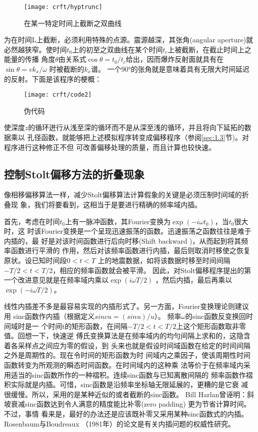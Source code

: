 \begin{figure}[H]
\centering
\texttt{[image: crft/hyptrunc]}
\caption[hyptrunc]{在某一特定时间上截断之双曲线}
\label{fig:crft/hyptrunc}
\end{figure}

为在时间L上截断，必须利用特殊的点源。震源越深，其张角(angular
aperture)就
必然越狭窄。使时间$t_0$上的初至之双曲线在某个时间$t_c$上被截断，在截止时间上之能量的传播
角度$\theta$由关系式$\cos\theta = t_0/t_c$给出，因而爆炸反射面就具有在$\sin\theta=vk_x/\omega$
时被截断的$k_x$谱。
一个90°的张角就是意味着具有无限大时间延迟的反射。下面是该程序的梗概：

\begin{figure}[H]
\centering
\texttt{[image: crft/code2]}
\caption[code2]{伪代码}
\label{fig:crft/code2}
\end{figure}

使深度$z$的循环迸行从浅至深的循环而不是从深至浅的循环，并且将向下延拓的数据乘以
孔径函数，就能够把上述模拟程序转变成偏移程序（参阅\ref{sec:1.3}节)。对程序进行这种修正不但
可改善偏移处理的质量，而且计算也较快速。


\subsection{控制Stolt偏移方法的折叠现象}
\label{sec:4.5.3}

像相移偏移算法一样，减少Stolt偏移算法计算假象的关键是必须压制时间域的折叠现
象，我们将要看到，这相当于是要进行精确的频率域内插。

首先，考虑在时间$t_0$上有一脉冲函数，其Fourier变换为$\exp(-i\omega t_0)$，当$t_0$很大时，这
时该Fourier变换是一个呈现迅速振荡的函数。迅速振荡之函数往往是难于内插的，最
好是对该时间函数进行后向时移(Shift backward
)，从而起到将其频率函数进行平滑的
作用，然后对该频率函数进行内插，最后则取消时移使之恢复原状。设已知时间段$0<t<T$
上的地震数据，如将该数据时移至时间间隔$-T/2<t<T/2$，相应的频率函数就会被平滑。
因此，对Stolt偏移程序提出的第一个改进意见就是在频率域内乘以$\exp(i\omega T/2)$
，然后内插，最后再乘以$\exp(-i\omega T/2)$。

线性内插差不多是最容易实现的内插形式了。另一方面，Fourier变换理论则建议用
sinc函数作内插（根据定义$sinc u= (sinu)/u$）。
频率$\omega$的sinc函数反变换回时间域时是一
个时间t的矩形函数，在间隔$-T/2<t<T/2$上这个矩形函数取非零值。回想一下，快速逆
傅氏变换算法是在频率域内的均勻间隔上求和的，这隐含着各采样点之间应为零的假设，到
头来也就是假设时间域函数在给定的时间间隔之外是周期性的。现在令时间的矩形函数为时
间域内之乘因子，使该周期性时间函数转变为所观测的瞬态时间函数。在时间域内的这种乘
法等价于在频率域内采用适当的sinc函数所作的一种褶积。连续sinc函数与已知离散间隔的
频率函数作褶积实际就是内插。可惜，sinc函数是沿频率坐标轴无限延展的，更糟的是它衰
减很缓慢。所以，采用的是某种近似的或者截断的sinc函数。 Bill
Harlan曾诬明：斜坡衰减sinc函数达到令人满意的精度能比补零(zero padding)
更为节省计算时间。不过，事情
看来是，最好的办法还是应该既补零又采用某种sinc函数式的内插。Rosenbaum与Boudreaux
（1981年）的论文是有关内插问题的权威性研究。

